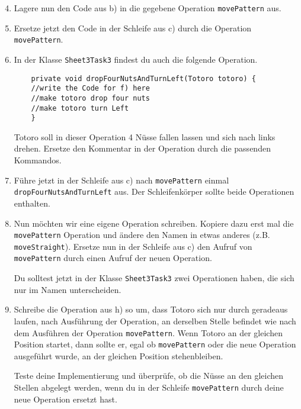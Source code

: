\begin{enumerate}\setcounter{enumi}{3}
	\item
	Lagere nun den Code aus b) in die gegebene Operation \lstinline{movePattern} aus.

	\item
	Ersetze jetzt den Code in der Schleife aus c) durch die Operation \lstinline{movePattern}.
	
	\item
	In der Klasse \lstinline{Sheet3Task3} findest du auch die folgende Operation.
	
	\begin{lstlisting}
	private void dropFourNutsAndTurnLeft(Totoro totoro) {
	//write the Code for f) here
	//make totoro drop four nuts
	//make totoro turn Left
	}
	\end{lstlisting}
	
	Totoro soll in dieser Operation 4 Nüsse fallen lassen und sich nach links drehen.
	Ersetze den Kommentar in der Operation durch die passenden Kommandos.
	
	\item
	Führe jetzt in der Schleife aus c) nach \lstinline{movePattern} einmal \lstinline{dropFourNutsAndTurnLeft} aus.
	Der Schleifenkörper sollte beide Operationen enthalten.
	
	\item
	Nun möchten wir eine eigene Operation schreiben.
	Kopiere dazu erst mal die \lstinline{movePattern} Operation und ändere den Namen in etwas anderes (z.B. \lstinline{moveStraight}).
	Ersetze nun in der Schleife aus c) den Aufruf von \lstinline{movePattern} durch einen Aufruf der neuen Operation.
	
	Du solltest jetzt in der Klasse \lstinline{Sheet3Task3} zwei Operationen haben, die sich nur im Namen unterscheiden.
	
	\item
	Schreibe die Operation aus h) so um, dass Totoro sich nur durch geradeaus laufen, nach Ausführung der Operation, an derselben Stelle befindet wie nach dem Ausführen der Operation \lstinline{movePattern}.
	Wenn Totoro an der gleichen Position startet, dann sollte er, egal ob \lstinline{movePattern} oder die neue Operation ausgeführt wurde, an der gleichen Position stehenbleiben.
	
	Teste deine Implementierung und überprüfe, ob die Nüsse an den gleichen Stellen abgelegt werden, wenn du in der Schleife \lstinline{movePattern} durch deine neue Operation ersetzt hast.
\end{enumerate}
\newpage
